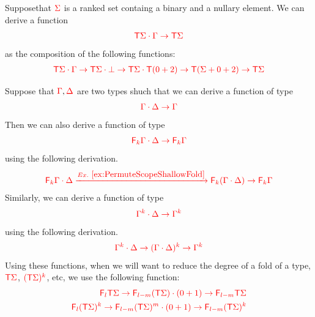  \begin{example}
 Supposethat ${\color{red}{\Sigma}}$ is a ranked set containg a binary and a nullary element. We can derive a function
 \begin{align*}
{\color{red}{{\color{red}{\mathsf T}}\Sigma\cdot\Gamma\to {\color{red}{\mathsf T}}\Sigma}}
 \end{align*}
 as the composition of the following functions:
 \begin{align*}
{\color{red}{{\color{red}{\mathsf T}}\Sigma\cdot\Gamma\to {\color{red}{\mathsf T}}\Sigma\cdot\bot\to{\color{red}{\mathsf T}}\Sigma\cdot{\color{red}{\mathsf T}}(0+2)\to {\color{red}{\mathsf T}}(\Sigma+0+2) \to {\color{red}{\mathsf T}}\Sigma}} 
 \end{align*}

Suppose that ${\color{red}{\Gamma}}, {\color{red}{\Delta}}$ are two types shuch that we can derive a function of type 
 \begin{align*}
 {\color{red}{\Gamma\cdot\Delta\to \Gamma}}
 \end{align*}
Then we can also derive a function of type 
\begin{align*}
{\color{red}{{\color{red}{\mathsf F_{k}}}\Gamma\cdot\Delta\to {\color{red}{\mathsf F_{k}}}\Gamma}}
\end{align*}
using the following derivation. 
\begin{align*}
{\color{red}{{\color{red}{\mathsf F_{k}}}\Gamma\cdot\Delta\xrightarrow{Ex.~\ref{ex:PermuteScopeShallowFold}} {\color{red}{\mathsf F_{k}}}(\Gamma\cdot\Delta) \to {\color{red}{\mathsf F_{k}}}\Gamma}}
\end{align*}
Similarly, we can derive a function of type
\begin{align*}
{\color{red}{ \Gamma^k\cdot\Delta\to \Gamma^k}}
\end{align*}
using the following derivation. 
\begin{align*}
{\color{red}{\Gamma^k\cdot\Delta\to (\Gamma\cdot\Delta)^k \to \Gamma^k}}
\end{align*}
Using these functions, when we will want to reduce the degree of a fold of a type, ${\color{red}{{\color{red}{\mathsf T}}\Sigma}}$, ${\color{red}{({\color{red}{\mathsf T}}\Sigma)^k}}$, etc, we use the following function:
\begin{align*}
{\color{red}{{\color{red}{\mathsf F_{l}}}{\color{red}{\mathsf T}}\Sigma\to {\color{red}{\mathsf F_{l-m}}}({\color{red}{\mathsf T}}\Sigma)\cdot(0+1)\to {\color{red}{\mathsf F_{l-m}}}{\color{red}{\mathsf T}}\Sigma }}\\
{\color{red}{{\color{red}{\mathsf F_{l}}}({\color{red}{\mathsf T}}\Sigma)^k\to {\color{red}{\mathsf F_{l-m}}}({\color{red}{\mathsf T}}\Sigma)^m\cdot(0+1)\to {\color{red}{\mathsf F_{l-m}}}({\color{red}{\mathsf T}}\Sigma)^k }}
\end{align*} 
\end{example}


